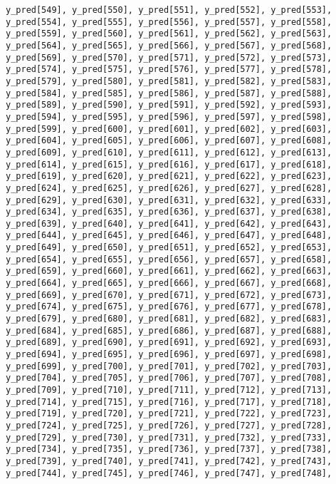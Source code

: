 \documentclass[
  letterpaper,
  DIV=11,
  numbers=noendperiod]{scrartcl}
\begin{document}
\begin{verbatim}
y_pred[549], y_pred[550], y_pred[551], y_pred[552], y_pred[553],
y_pred[554], y_pred[555], y_pred[556], y_pred[557], y_pred[558],
y_pred[559], y_pred[560], y_pred[561], y_pred[562], y_pred[563],
y_pred[564], y_pred[565], y_pred[566], y_pred[567], y_pred[568],
y_pred[569], y_pred[570], y_pred[571], y_pred[572], y_pred[573],
y_pred[574], y_pred[575], y_pred[576], y_pred[577], y_pred[578],
y_pred[579], y_pred[580], y_pred[581], y_pred[582], y_pred[583],
y_pred[584], y_pred[585], y_pred[586], y_pred[587], y_pred[588],
y_pred[589], y_pred[590], y_pred[591], y_pred[592], y_pred[593],
y_pred[594], y_pred[595], y_pred[596], y_pred[597], y_pred[598],
y_pred[599], y_pred[600], y_pred[601], y_pred[602], y_pred[603],
y_pred[604], y_pred[605], y_pred[606], y_pred[607], y_pred[608],
y_pred[609], y_pred[610], y_pred[611], y_pred[612], y_pred[613],
y_pred[614], y_pred[615], y_pred[616], y_pred[617], y_pred[618],
y_pred[619], y_pred[620], y_pred[621], y_pred[622], y_pred[623],
y_pred[624], y_pred[625], y_pred[626], y_pred[627], y_pred[628],
y_pred[629], y_pred[630], y_pred[631], y_pred[632], y_pred[633],
y_pred[634], y_pred[635], y_pred[636], y_pred[637], y_pred[638],
y_pred[639], y_pred[640], y_pred[641], y_pred[642], y_pred[643],
y_pred[644], y_pred[645], y_pred[646], y_pred[647], y_pred[648],
y_pred[649], y_pred[650], y_pred[651], y_pred[652], y_pred[653],
y_pred[654], y_pred[655], y_pred[656], y_pred[657], y_pred[658],
y_pred[659], y_pred[660], y_pred[661], y_pred[662], y_pred[663],
y_pred[664], y_pred[665], y_pred[666], y_pred[667], y_pred[668],
y_pred[669], y_pred[670], y_pred[671], y_pred[672], y_pred[673],
y_pred[674], y_pred[675], y_pred[676], y_pred[677], y_pred[678],
y_pred[679], y_pred[680], y_pred[681], y_pred[682], y_pred[683],
y_pred[684], y_pred[685], y_pred[686], y_pred[687], y_pred[688],
y_pred[689], y_pred[690], y_pred[691], y_pred[692], y_pred[693],
y_pred[694], y_pred[695], y_pred[696], y_pred[697], y_pred[698],
y_pred[699], y_pred[700], y_pred[701], y_pred[702], y_pred[703],
y_pred[704], y_pred[705], y_pred[706], y_pred[707], y_pred[708],
y_pred[709], y_pred[710], y_pred[711], y_pred[712], y_pred[713],
y_pred[714], y_pred[715], y_pred[716], y_pred[717], y_pred[718],
y_pred[719], y_pred[720], y_pred[721], y_pred[722], y_pred[723],
y_pred[724], y_pred[725], y_pred[726], y_pred[727], y_pred[728],
y_pred[729], y_pred[730], y_pred[731], y_pred[732], y_pred[733],
y_pred[734], y_pred[735], y_pred[736], y_pred[737], y_pred[738],
y_pred[739], y_pred[740], y_pred[741], y_pred[742], y_pred[743],
y_pred[744], y_pred[745], y_pred[746], y_pred[747], y_pred[748],

\end{verbatim}
\end{document}
